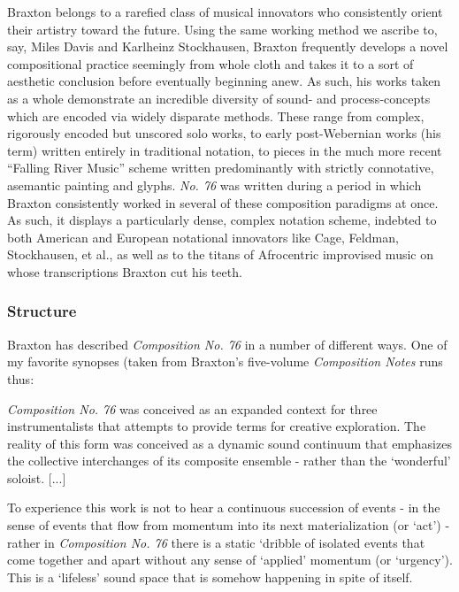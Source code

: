         Braxton belongs to a rarefied class of musical innovators who consistently orient their artistry toward the future. Using the same working method we ascribe to, say, Miles Davis and Karlheinz Stockhausen, Braxton frequently develops a novel compositional practice seemingly from whole cloth and takes it to a sort of aesthetic conclusion before eventually beginning anew. As such, his works taken as a whole demonstrate an incredible diversity of sound- and process-concepts which are encoded via widely disparate methods. These range from complex, rigorously encoded but unscored solo works, to early post-Webernian works (his term) written entirely in traditional notation, to pieces in the much more recent ``Falling River Music'' scheme written predominantly with strictly connotative, asemantic painting and glyphs. \textit{No. 76} was written during a period in which Braxton consistently worked in several of these composition paradigms at once. As such, it displays a particularly dense, complex notation scheme, indebted to both American and European notational innovators like Cage, Feldman, Stockhausen, et al., as well as to the titans of Afrocentric improvised music on whose transcriptions Braxton cut his teeth.

    \subsubsection{Structure}

        Braxton has described \textit{Composition No. 76} in a number of different ways. One of my favorite synopses (taken from Braxton's five-volume \textit{Composition Notes} runs thus:

        \begin{smallquote}
            \textit{Composition No. 76} was conceived as an expanded context for three instrumentalists that attempts to provide terms for creative exploration. The reality of this form was conceived as a dynamic sound continuum that emphasizes the collective interchanges of its composite ensemble - rather than the `wonderful' soloist. [...]

            \vspace{7pt}

            \noindent To experience this work is not to hear a continuous succession of events - in the sense of events that flow from momentum into its next materialization (or `act') - rather in \textit{Composition No. 76} there is a static `dribble of isolated events that come together and apart without any sense of `applied' momentum (or `urgency'). This is a `lifeless' sound space that is somehow happening in spite of itself.\autocite[145-8]{Braxton_1988}
        \end{smallquote}
    
